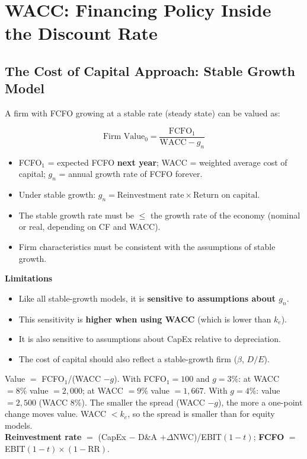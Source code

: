 \section{WACC: Financing Policy Inside the Discount Rate}

\subsection[The Cost of Capital Approach: Stable Growth Model]{The Cost of Capital Approach: Stable Growth Model }

A firm with FCFO growing at a stable rate (steady state) can be valued as:
\begin{keybox}
\[
\text{Firm Value}_0 = \frac{\text{FCFO}_1}{\text{WACC}-g_n}
\]
\begin{itemize}[leftmargin=*]
  \item FCFO$_1$ = expected FCFO \textbf{next year}; WACC = weighted average cost of capital; $g_n$ = annual growth rate of FCFO forever.
  \item Under stable growth: $\boxed{g_n = \text{Reinvestment rate}\times\text{Return on capital}}$.
  \item The stable growth rate must be $\leq$ the growth rate of the economy (nominal or real, depending on CF and WACC).
  \item Firm characteristics must be consistent with the assumptions of stable growth.
\end{itemize}
\end{keybox}
\textbf{Limitations}
\begin{itemize}
  \item Like all stable-growth models, it is \textbf{sensitive to assumptions about $g_n$}.
  \item This sensitivity is \textbf{higher when using WACC} (which is lower than $k_e$).
  \item It is also sensitive to assumptions about CapEx relative to depreciation.
  \item The cost of capital should also reflect a stable-growth firm ($\beta$, $D/E$).
\end{itemize}
\begin{addbox}
Value $=$ FCFO$_1$/(WACC $-g$). With FCFO$_1=100$ and $g=3\%$: at WACC $=8\%$ value $=2{,}000$; at WACC $=9\%$ value $=1{,}667$. With $g=4\%$: value $=2{,}500$ (WACC 8\%). The smaller the spread (WACC $-g$), the more a one-point change moves value. WACC $<k_e$, so the spread is smaller than for equity models.\\
\textbf{Reinvestment rate} $=$ (CapEx $-$ D\&A $+\Delta$NWC)/EBIT$(1-t)$; \textbf{FCFO} $=$ EBIT$(1-t)\times(1-\text{RR})$.
\end{addbox}

